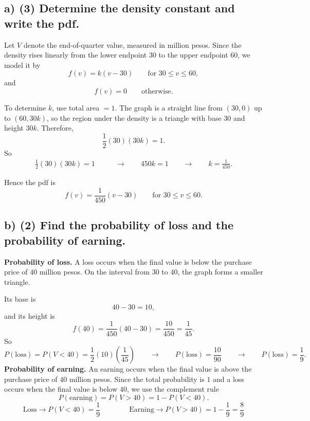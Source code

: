 \subsection*{a) \textbf{(3)} Determine the density constant and write the pdf.}
\label{subsec:online-coffee-sales-investment-c1-a}
Let $V$ denote the end-of-quarter value, measured in million pesos. Since the density rises linearly from the lower endpoint $30$ to the upper endpoint $60$, we model it by
\[
f(v)=k(v-30)\qquad \text{for }30\le v\le 60,
\]
and
\[
f(v)=0\qquad \text{otherwise.}
\]

To determine $k$, use total area $=1$. The graph is a straight line from $(30,0)$ up to $(60,30k)$, so the region under the density is a triangle with base $30$ and height $30k$. Therefore,
\[
\frac12(30)(30k)=1.
\]
So
\[
\begin{aligned}
\frac12(30)(30k)=1
&\qquad \longrightarrow \qquad 450k=1
\qquad \longrightarrow \qquad k=\frac{1}{450}.
\end{aligned}
\]

Hence the pdf is
\[
f(v)=\frac{1}{450}(v-30)\qquad \text{for }30\le v\le 60.
\]


\subsection*{b) \textbf{(2)} Find the probability of loss and the probability of earning.}
\label{subsec:online-coffee-sales-investment-c1-b}
\textbf{Probability of loss.} A loss occurs when the final value is below the purchase price of $40$ million pesos. On the interval from $30$ to $40$, the graph forms a smaller triangle.

Its base is
\[
40-30=10,
\]
and its height is
\[
f(40)=\frac{1}{450}(40-30)=\frac{10}{450}=\frac{1}{45}.
\]
So
\[
P(\text{loss})=P(V<40)=\frac12(10)\left(\frac{1}{45}\right)\qquad \longrightarrow \qquad P(\text{loss})=\frac{10}{90}\qquad \longrightarrow \qquad P(\text{loss})=\frac{1}{9}.
\]
\textbf{Probability of earning.}
An earning occurs when the final value is above the purchase price of $40$ million pesos. Since the total probability is $1$ and a loss occurs when the final value is below $40$, we use the complement rule
\[
P(\text{earning})=P(V>40)=1-P(V<40).
\]
\[
\text{Loss} \rightarrow P(V<40)=\frac{1}{9}
\qquad\qquad
\text{Earning} \rightarrow P(V>40)=1-\frac{1}{9}=\frac{8}{9}
\]

